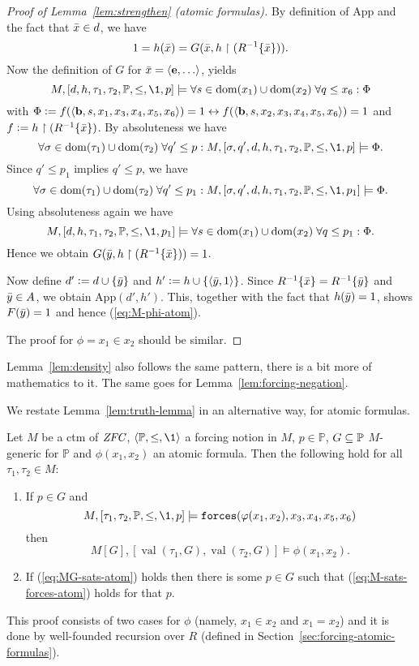 \documentclass[11pt,english]{article}
\renewcommand{\PP}{\mathbb{P}}
\renewcommand{\app}{\mathrm{App}}
\newcommand{\forceisa}{\mathtt{forces}}
\newcommand{\equ}{\mathbf{e}}
\newcommand{\bel}{\mathbf{b}}
\DeclareMathOperator{\val}{val}
\begin{document}
\begin{proof}[Proof of  Lemma~\ref{lem:strengthen} (atomic formulas)]
  By  definition of $\app$ and the fact that $\bar{x}\in d$, we have
  \[
  1= h(\bar{x}) = G(\bar{x},h\upharpoonright(R^{-1}\{\bar{x}\})).
  \]
  Now the  definition of $G$ for $\bx=\lb\equ,\dots\rb$, yields
  \[
  M,[d,h,\tau_1,\tau_2,\PP,\leq,\1,p]\models \forall
  s\in\dom(x_1)\cup\dom(x_2)\;\forall q\leq x_6 : \Phi
  \]
  with $\Phi\defi
  f(\lb\bel,s,x_1,x_{3},x_{4},x_{5},x_{6}\rb) =1  \lsii
  f(\lb\bel,s,x_2,x_{3},x_{4},x_{5},x_{6}\rb) =1$ and 
  $f\mathrel{\mathop:}= h\upharpoonright(R^{-1}\{\bar{x}\})$.
  By absoluteness we have
  \[
  \forall
  \sigma\in\dom(\tau_1)\cup\dom(\tau_2)\;\forall q'\leq p :
  M,[\sigma,q',d,h,\tau_1,\tau_2,\PP,\leq,\1,p]\models  \Phi.
  \]
  Since $q'\leq p_1$ implies $q'\leq p$, we have
  \[
  \forall
  \sigma\in\dom(\tau_1)\cup\dom(\tau_2)\;\forall q'\leq p_1 :
  M,[\sigma,q',d,h,\tau_1,\tau_2,\PP,\leq,\1,p_1]\models  \Phi.
  \]
  Using absoluteness again we have
  \[
  M,[d,h,\tau_1,\tau_2,\PP,\leq,\1,p_1]\models \forall
  s\in\dom(x_1)\cup\dom(x_2)\;\forall q\leq p_1 : \Phi.
  \]
  Hence we obtain $G(\bar{y},h\upharpoonright(R^{-1}\{\bar{x}\}))=1$. 

  Now define   $d'\mathrel{\mathop:}= d\cup \{\bar{y}\}$  and $h'\mathrel{\mathop:}=
  h\cup\{\langle\bar{y},1\rangle\}$. Since
  $R^{-1}\{\bar{x}\} =R^{-1}\{\bar{y}\}$ and $\bar{y}\in A$, we obtain
  $\app(d',h')$. This, together with the fact that $h(\bar{y})=1$, shows
  $F(\bar{y})=1$ and hence (\ref{eq:M-phi-atom}).

  The proof for $\phi= x_1\in x_2$ should be similar.
\end{proof}
Lemma~\ref{lem:density} also follows the same pattern, there is a bit
more of mathematics to it. The same goes for
Lemma~\ref{lem:forcing-negation}.


We restate Lemma~\ref{lem:truth-lemma} in an alternative way, for
atomic formulas.
\begin{lemma}
  Let $M$ be a ctm of $\mathit{ZFC}$, $\lb\PP,\leq,\1\rb$ a forcing notion
  in $M$, $p\in\PP$, $G\sbq\PP$ $M$-generic for $\PP$ and $\phi(x_1,x_2)$ an
  atomic formula. Then the following hold for all
  $\tau_1,\tau_2\in M$:
  \begin{enumerate}
  \item If $p\in G$ and
    \begin{equation} \label{eq:M-sats-forces-atom}
      M,[\tau_1,\tau_2,\PP,\leq,\1,p] 
      \models\forceisa(\phi(x_1,x_2),x_{3},x_{4},x_{5},x_{6})
    \end{equation}
    then
    \begin{equation} \label{eq:MG-sats-atom}
      M[G],[\val(\tau_1,G),\val(\tau_2,G)]
      \models\phi(x_1,x_2).
    \end{equation}
  \item If (\ref{eq:MG-sats-atom}) holds 
    then there is some $p\in G$ such that
    (\ref{eq:M-sats-forces-atom}) holds for that $p$.
  \end{enumerate}
\end{lemma}
This proof consists of two cases for $\phi$ (namely, $x_1\in x_2$ and
$x_1=x_2$) and it is done by well-founded recursion over $R$ (defined
in Section~\ref{sec:forcing-atomic-formulas}).
\end{document}
